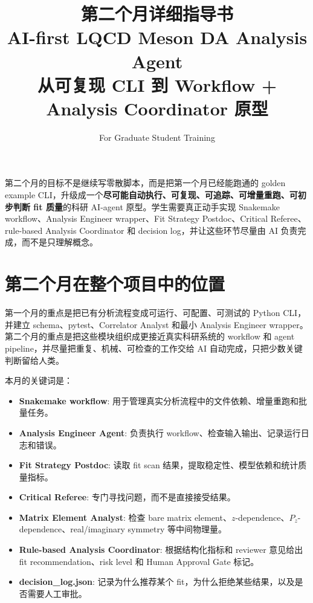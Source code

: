 \documentclass[11pt,a4paper,fontset=none]{ctexart}
\title{第二个月详细指导书\\
AI-first LQCD Meson DA Analysis Agent\\
从可复现 CLI 到 Workflow + Analysis Coordinator 原型}
\author{For Graduate Student Training}
\date{ }
\begin{document}
\maketitle

\begin{tcolorbox}[colback=blue!4,colframe=blue!45!black,title=第二个月核心目标]
第二个月的目标不是继续写零散脚本，而是把第一个月已经能跑通的 golden example CLI，升级成一个\textbf{尽可能自动执行、可复现、可追踪、可增量重跑、可初步判断 fit 质量}的科研 AI-agent 原型。学生需要真正动手实现 Snakemake workflow、Analysis Engineer wrapper、Fit Strategy Postdoc、Critical Referee、rule-based Analysis Coordinator 和 decision log，并让这些环节尽量由 AI 负责完成，而不是只理解概念。
\end{tcolorbox}

\tableofcontents
\newpage

\section{第二个月在整个项目中的位置}

第一个月的重点是把已有分析流程变成可运行、可配置、可测试的 Python CLI，并建立 schema、pytest、Correlator Analyst 和最小 Analysis Engineer wrapper。第二个月的重点是把这些模块组织成更接近真实科研系统的 workflow 和 agent pipeline，并尽量把重复、机械、可检查的工作交给 AI 自动完成，只把少数关键判断留给人类。

本月的关键词是：

\begin{itemize}[leftmargin=2em]
  \item \textbf{Snakemake workflow}: 用于管理真实分析流程中的文件依赖、增量重跑和批量任务。
  \item \textbf{Analysis Engineer Agent}: 负责执行 workflow、检查输入输出、记录运行日志和错误。
  \item \textbf{Fit Strategy Postdoc}: 读取 fit scan 结果，提取稳定性、模型依赖和统计质量指标。
  \item \textbf{Critical Referee}: 专门寻找问题，而不是直接接受结果。
  \item \textbf{Matrix Element Analyst}: 检查 bare matrix element、$z$-dependence、$P_z$-dependence、real/imaginary symmetry 等中间物理量。
  \item \textbf{Rule-based Analysis Coordinator}: 根据结构化指标和 reviewer 意见给出 fit recommendation、risk level 和 Human Approval Gate 标记。
  \item \textbf{decision\_log.json}: 记录为什么推荐某个 fit，为什么拒绝某些结果，以及是否需要人工审批。
\end{itemize}
\end{document}
